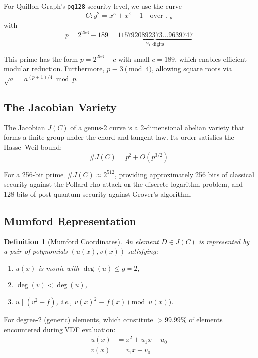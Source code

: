 \documentclass[11pt,a4paper]{article}
\newtheorem{definition}{Definition}[section]
\begin{document}
For Quillon Graph's \texttt{pq128} security level, we use the curve
\begin{equation}
\label{eq:curve}
    C: y^2 = x^5 + x^2 - 1 \quad \text{over } \mathbb{F}_p
\end{equation}
with
\begin{equation}
\label{eq:prime}
    p = 2^{256} - 189 = \underbrace{1157920892373\ldots 9639747}_{77 \text{ digits}}
\end{equation}

This prime has the form $p = 2^{256} - c$ with small $c = 189$, which enables efficient modular reduction. Furthermore, $p \equiv 3 \pmod{4}$, allowing square roots via $\sqrt{a} = a^{(p+1)/4} \bmod p$.

\subsection{The Jacobian Variety}

The Jacobian $J(C)$ of a genus-2 curve is a 2-dimensional abelian variety that forms a finite group under the chord-and-tangent law. Its order satisfies the Hasse--Weil bound:
\begin{equation}
    \# J(C) = p^2 + O(p^{3/2})
\end{equation}

For a 256-bit prime, $\#J(C) \approx 2^{512}$, providing approximately 256 bits of classical security against the Pollard-rho attack on the discrete logarithm problem, and 128 bits of post-quantum security against Grover's algorithm.

\subsection{Mumford Representation}

\begin{definition}[Mumford Coordinates]
\label{def:mumford}
An element $D \in J(C)$ is represented by a pair of polynomials $(u(x), v(x))$ satisfying:
\begin{enumerate}[label=(\roman*)]
    \item $u(x)$ is monic with $\deg(u) \leq g = 2$,
    \item $\deg(v) < \deg(u)$,
    \item $u \mid (v^2 - f)$, i.e., $v(x)^2 \equiv f(x) \pmod{u(x)}$.
\end{enumerate}
\end{definition}

For degree-2 (generic) elements, which constitute $> 99.99\%$ of elements encountered during VDF evaluation:
\begin{align}
    u(x) &= x^2 + u_1 x + u_0 \\
    v(x) &= v_1 x + v_0
\end{align}
\end{document}
